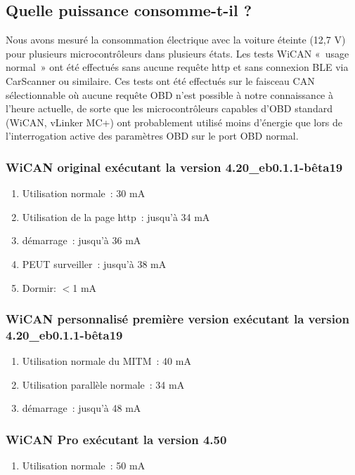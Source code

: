 \documentclass[superscriptaddress,onecolumn,floatfix]{revtex4-2}
\begin{document}
\subsection{Quelle puissance consomme-t-il ?}

Nous avons mesuré la consommation électrique avec la voiture éteinte (12,7 V) pour plusieurs microcontrôleurs dans plusieurs états. Les tests WiCAN « usage normal » ont été effectués sans aucune requête http et sans connexion BLE via CarScanner ou similaire. Ces tests ont été effectués sur le faisceau CAN sélectionnable où aucune requête OBD n'est possible à notre connaissance à l'heure actuelle, de sorte que les microcontrôleurs capables d'OBD standard (WiCAN, vLinker MC+) ont probablement utilisé moins d'énergie que lors de l'interrogation active des paramètres OBD sur le port OBD normal. 

\subsubsection{WiCAN original exécutant la version 4.20\_eb0.1.1-bêta19}
\begin{enumerate}
  \item{Utilisation normale :} 30 mA
  \item{Utilisation de la page http :} jusqu'à 34 mA
  \item{démarrage :} jusqu'à 36 mA
  \item{PEUT surveiller :} jusqu'à 38 mA
  \item{Dormir:} $<$1 mA
\end{enumerate}

\subsubsection{WiCAN personnalisé première version exécutant la version 4.20\_eb0.1.1-bêta19}
\begin{enumerate}
  \item{Utilisation normale du MITM :} 40 mA
  \item{Utilisation parallèle normale :} 34 mA
  \item{démarrage :} jusqu'à 48 mA
\end{enumerate}

\subsubsection{WiCAN Pro exécutant la version 4.50}
\begin{enumerate}
  \item{Utilisation normale :} 50 mA
\end{enumerate}
\end{document}

